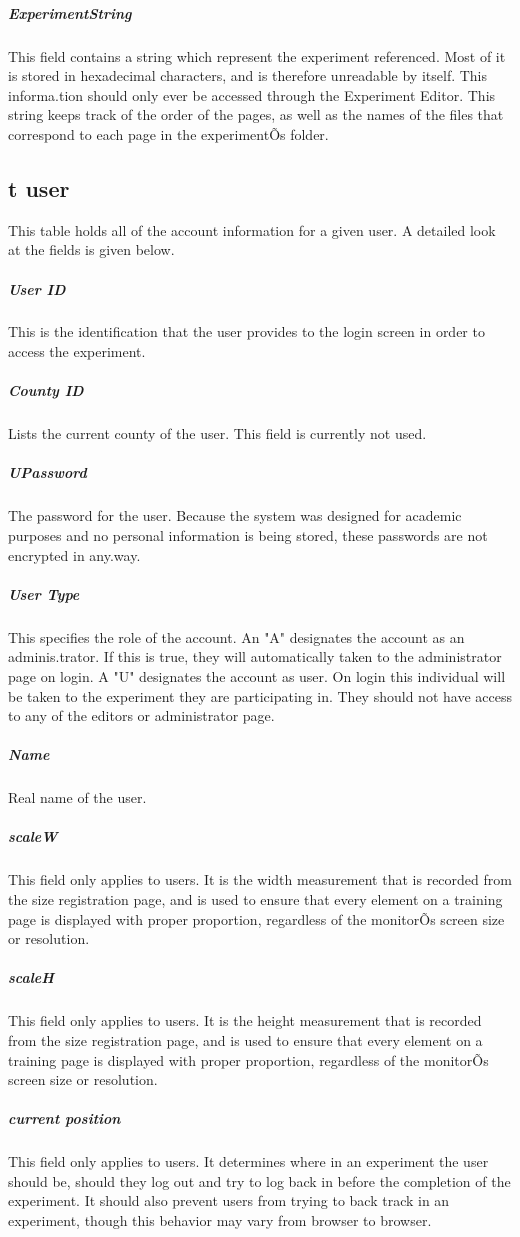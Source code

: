 \documentclass[article]{ij4uq}              %
\begin{document}
\subparagraph{ExperimentString}
This field contains a string which represent the experiment referenced. Most of it is stored in hexadecimal characters, and is therefore unreadable by itself. This informa.tion should only ever be accessed through the Experiment Editor. This string keeps track of the order of the pages, as well as the names of the files that correspond to each page in the experimentÕs folder. 


\subsection{t user}
This table holds all of the account information for a given user. A detailed look at the fields is given below.

\subparagraph{User ID}
This is the identification that the user provides to the login screen in order to access the experiment. 

\subparagraph{County ID}
Lists the current county of the user. This field is currently not used. 

\subparagraph{UPassword}
The password for the user. Because the system was designed for academic purposes and no personal information is being stored, these passwords are not encrypted in any.way.

\subparagraph{User Type}
This specifies the role of the account. An "A" designates the account as an adminis.trator. If this is true, they will automatically taken to the administrator page on login. A "U" designates the account as user. On login this individual will be taken to the experiment they are participating in. They should not have access to any of the editors or administrator page. 

\subparagraph{Name}
Real name of the user. 

\subparagraph{scaleW}
This field only applies to users. It is the width measurement that is recorded from the size registration page, and is used to ensure that every element on a training page is displayed with proper proportion, regardless of the monitorÕs screen size or resolution. 

\subparagraph{scaleH}
This field only applies to users. It is the height measurement that is recorded from the size registration page, and is used to ensure that every element on a training page is displayed with proper proportion, regardless of the monitorÕs screen size or resolution. 

\subparagraph{current position}
This field only applies to users. It determines where in an experiment the user should be, should they log out and try to log back in before the completion of the experiment. It should also prevent users from trying to back track in an experiment, though this behavior may vary from browser to browser. 
\end{document}
